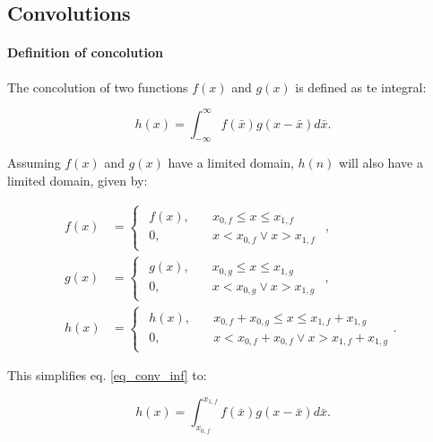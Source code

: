 \subsection{Convolutions}
\paragraph{Definition of concolution}

The concolution of two functions $f(x)$ and $g(x)$ is defined as te integral:

\begin{equation}\label{eq_conv_inf}
h(x) = \int_{-\infty}^\infty f(\bar{x})g(x-\bar{x}) d\bar{x}.
\end{equation}

Assuming $f(x)$ and $g(x)$ have a limited domain, $h(n)$ will also have a limited domain, given by:

\begin{equation}
	\begin{aligned}
		f(x) &= \begin{cases}
			\begin{aligned}
				f(x), \quad &x_{0,f} \leq x \leq x_{1,f}\\
				0, \quad &x < x_{0,f} \vee x>x_{1,f}
			\end{aligned}
		\end{cases},\\
		g(x) &= \begin{cases}
			\begin{aligned}
				g(x), \quad &x_{0,g} \leq x \leq x_{1,g}\\
				0, \quad &x < x_{0,g} \vee x>x_{1,g}
			\end{aligned}
		\end{cases},\\
		h(x) &= \begin{cases}
			\begin{aligned}
				h(x), \quad &x_{0,f} + x_{0,g} \leq x \leq x_{1,f} + x_{1,g}\\
				0, \quad &x < x_{0,f} +x_{0,f} \vee x>x_{1,f} + x_{1,g}
			\end{aligned}.
		\end{cases}
	\end{aligned}
\end{equation}

This simplifies eq. \eqref{eq_conv_inf} to:

\begin{equation}
h(x) = \int_{x_{0,f}}^{x_{1,f}} f(\bar{x})g(x-\bar{x}) d\bar{x}.
\end{equation}







